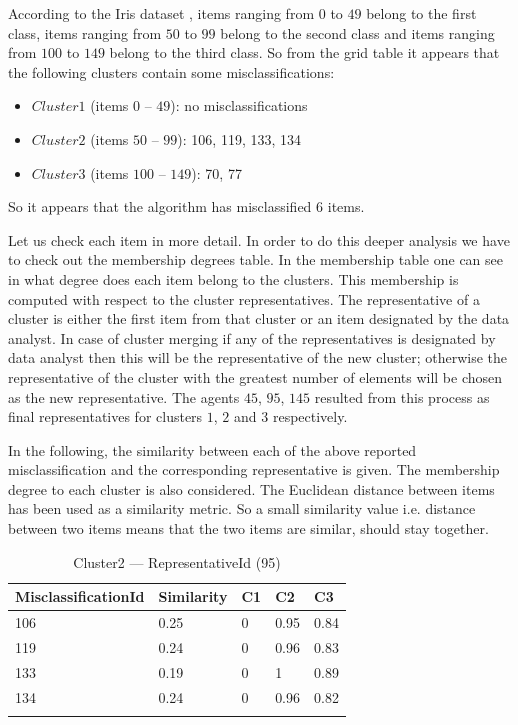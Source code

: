 According to the Iris dataset \cite{website:iris}, items ranging from $0$ to $49$ belong to the first class, items ranging from $50$ to $99$ belong to the second class and items ranging from $100$ to $149$ belong to the third class. So from the grid table it appears that the following clusters contain some misclassifications:
\begin{itemize}
\item $Cluster1$ (items $0$ -- $49$): no misclassifications
\item $Cluster2$ (items $50$ -- $99$): 106, 119, 133, 134
\item $Cluster3$ (items $100$ -- $149$): 70, 77 
\end{itemize}
So it appears that the algorithm has misclassified $6$ items. 

Let us check each item in more detail. In order to do this deeper analysis we have to check out the membership degrees table. In the membership table one can see in what degree does each item belong to the clusters. This membership is computed with respect to the cluster representatives. The representative of a cluster is either the first item from that cluster or an item designated by the data analyst. In case of cluster merging if any of the representatives is designated by data analyst then this will be the representative of the new cluster; otherwise the representative of the cluster with the greatest number of elements will be chosen as the new representative. 
The agents $45$, $95$, $145$ resulted from this process as final representatives for clusters $1$, $2$ and $3$ respectively.

In the following, the similarity between each of the above reported misclassification and the corresponding representative is given. The membership degree to each cluster is also considered. The Euclidean distance between items has been used as a similarity metric. So a small similarity value i.e. distance between two items means that the two items are similar, should stay together.
\begin{table}[h!]
\begin{tabular}{lllll}
\cline{1-5}
MisclassificationId & Similarity  & C1 & C2 & C3\\ 
\hline
106 & 0.25 & 0 & 0.95 & 0.84\\
119 & 0.24 & 0 & 0.96 & 0.83\\
133 & 0.19 & 0 & 1    & 0.89\\
134 & 0.24 & 0 & 0.96 & 0.82\\
\hline \\
\end{tabular} 
\caption{Cluster2 --- RepresentativeId (95)}
\label{tab:cluster2id95}
\end{table}

